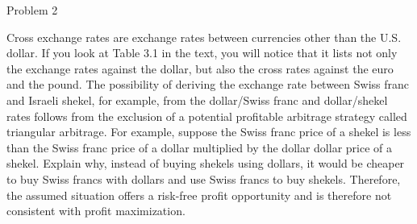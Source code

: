 \documentclass[12pt,aspectratio=169]{beamer}
\newif\ifshowsolution
\begin{document}
\fi


\begin{frame}{Problem 2}

\small
Cross exchange rates are exchange rates between currencies other than the U.S. dollar. If you look at Table 3.1 in the text, you will notice that it lists not only the exchange rates against the dollar, but also the cross rates against the euro and the pound. The possibility of deriving the exchange rate between Swiss franc and Israeli shekel, for example, from the dollar/Swiss franc and dollar/shekel rates follows from the exclusion of a potential profitable arbitrage strategy called triangular arbitrage. For example, suppose the Swiss franc price of a shekel is less than the Swiss franc price of a dollar multiplied by the dollar dollar price of a shekel. Explain why, instead of buying shekels using dollars, it would be cheaper to buy Swiss francs with dollars and use Swiss francs to buy shekels. Therefore, the assumed situation offers a risk-free profit opportunity and is therefore not consistent with profit maximization.

\end{frame}

\ifshowsolution

\begin{frame}{Problem 2 - solution}

The Swiss who needs Schekel can:

- buy Shekels at the exchange rate $E_{Shekel/Fr}$

- buy another currency that can then convert to Sheckel

Regarding this second strategy, we assume that 

- Francs are converted into US Dollars at $E_{\$/Fr}$

- the \$ is converted to Shekels at $E_{Shekel/\$}$

The product $$E_{\$/Fr}\times E_{Shekel/\$}=\hat{E}_{Shekel/Fr}$$ informs us about the amount of Sheckel obtained with one franc following the second strategy.

If $\hat{E}_{Shekel/Fr}>E_{Shekel/Fr}$, you get more Shekels with 1 franc by implementing the second strategy. The choice of this strategy implies an increase in demand for \$, and therefore an appreciation of \$ against the franc ($E_{\$/Fr} \downarrow$). This will decrease the difference $\hat{E}_{Shekel/Fr}-E_{Shekel/Fr}$ until it is cancelled.
\end{frame}

\fi
\end{document}
